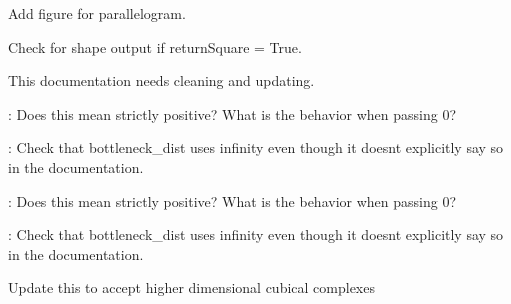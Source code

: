 
\begin{DoxyRefList}
\item[\label{todo__todo000002}%
\hypertarget{todo__todo000002}{}%
Member \hyperlink{namespaceteaspoon_1_1_m_l_1_1tents_a19cc99365f3d375bf1ea7535095c15e3}{teaspoon\+:\+:ML\+:\+:tents.build\+\_\+G} (Dgms, d=10, delta=1, epsilon=0, max\+Power=1, feature\+Func=tent)]Add figure for parallelogram.  
\item[\label{todo__todo000001}%
\hypertarget{todo__todo000001}{}%
Member \hyperlink{namespaceteaspoon_1_1_m_l_1_1tents_ac230b402d60eb765d2c2776027afaaa9}{teaspoon\+:\+:ML\+:\+:tents.build\+\_\+\+Gm} (Dgm, d=10, delta=1, epsilon=0, feature\+Func=tent, return\+Square=False)]Check for shape output if return\+Square = True.  
\item[\label{todo__todo000003}%
\hypertarget{todo__todo000003}{}%
Member \hyperlink{namespaceteaspoon_1_1_t_d_a_1_1_distance_ad3481b3888962dbf302bacb9d9504e8b}{teaspoon\+:\+:T\+DA\+:\+:Distance.dgm\+Dist\+\_\+\+Hera} (D1, D2, wass\+Deg=\textquotesingle{}Bottleneck\textquotesingle{}, rel\+Error=None, internal\+\_\+p=None)]This documentation needs cleaning and updating.

\+: Does this mean strictly positive? What is the behavior when passing 0? 

\+: Check that bottleneck\+\_\+dist uses infinity even though it doesn\textquotesingle{}t explicitly say so in the documentation.

\+: Does this mean strictly positive? What is the behavior when passing 0? 

\+: Check that bottleneck\+\_\+dist uses infinity even though it doesn\textquotesingle{}t explicitly say so in the documentation. 
\item[\label{todo__todo000007}%
\hypertarget{todo__todo000007}{}%
Member \hyperlink{namespaceteaspoon_1_1_t_d_a_1_1_persistence_aa583aa9a694aeaa3983e77319ac68e84}{teaspoon\+:\+:T\+DA\+:\+:Persistence.Cubical\+\_\+\+Perseus} (M, num\+Digits=2, suppress\+Output=True)]Update this to accept higher dimensional cubical complexes 
\item[\label{todo__todo000006}%
\hypertarget{todo__todo000006}{}%
Member \hyperlink{namespaceteaspoon_1_1_t_d_a_1_1_persistence_a0660fcd00ca57001f21bfaaefb1da9c3}{teaspoon\+:\+:T\+DA\+:\+:Persistence.dist\+Mat\+\_\+\+Perseus} ()]
\end{DoxyRefList}